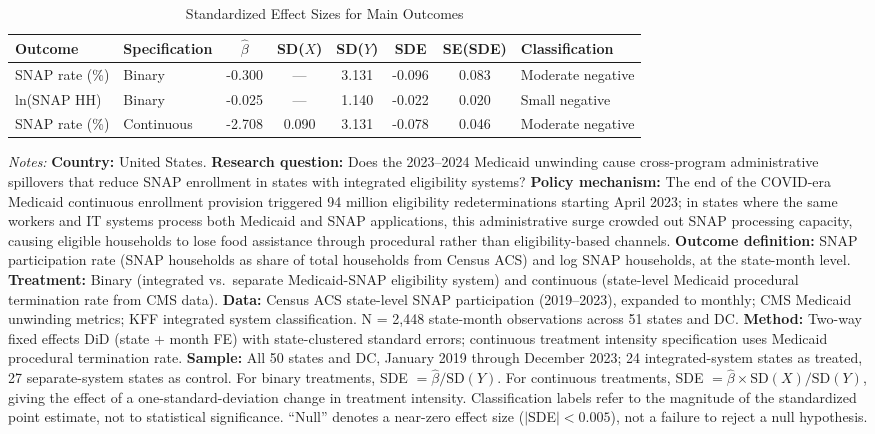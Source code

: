 \begin{table}[H]
\centering
\caption{Standardized Effect Sizes for Main Outcomes}
\label{tab:sde}
\begin{adjustbox}{max width=\textwidth}
\begin{tabular}{llcccccl}
\toprule
Outcome & Specification & $\hat{\beta}$ & SD($X$) & SD($Y$) & SDE & SE(SDE) & Classification \\
\midrule
SNAP rate (\%) & Binary & -0.300 & --- & 3.131 & -0.096 & 0.083 & Moderate negative \\
ln(SNAP HH) & Binary & -0.025 & --- & 1.140 & -0.022 & 0.020 & Small negative \\
SNAP rate (\%) & Continuous & -2.708 & 0.090 & 3.131 & -0.078 & 0.046 & Moderate negative \\
\bottomrule
\end{tabular}
\end{adjustbox}
\par\vspace{0.3em}
{\footnotesize
\item \textit{Notes:} \textbf{Country:} United States. \textbf{Research question:} Does the 2023--2024 Medicaid unwinding cause cross-program administrative spillovers that reduce SNAP enrollment in states with integrated eligibility systems? \textbf{Policy mechanism:} The end of the COVID-era Medicaid continuous enrollment provision triggered 94 million eligibility redeterminations starting April 2023; in states where the same workers and IT systems process both Medicaid and SNAP applications, this administrative surge crowded out SNAP processing capacity, causing eligible households to lose food assistance through procedural rather than eligibility-based channels. \textbf{Outcome definition:} SNAP participation rate (SNAP households as share of total households from Census ACS) and log SNAP households, at the state-month level. \textbf{Treatment:} Binary (integrated vs.\ separate Medicaid-SNAP eligibility system) and continuous (state-level Medicaid procedural termination rate from CMS data). \textbf{Data:} Census ACS state-level SNAP participation (2019--2023), expanded to monthly; CMS Medicaid unwinding metrics; KFF integrated system classification. N = 2,448 state-month observations across 51 states and DC. \textbf{Method:} Two-way fixed effects DiD (state + month FE) with state-clustered standard errors; continuous treatment intensity specification uses Medicaid procedural termination rate. \textbf{Sample:} All 50 states and DC, January 2019 through December 2023; 24 integrated-system states as treated, 27 separate-system states as control. For binary treatments, SDE $= \hat{\beta} / \text{SD}(Y)$. For continuous treatments, SDE $= \hat{\beta} \times \text{SD}(X) / \text{SD}(Y)$, giving the effect of a one-standard-deviation change in treatment intensity. Classification labels refer to the magnitude of the standardized point estimate, not to statistical significance. ``Null'' denotes a near-zero effect size ($|$SDE$| < 0.005$), not a failure to reject a null hypothesis.
}
\end{table}
